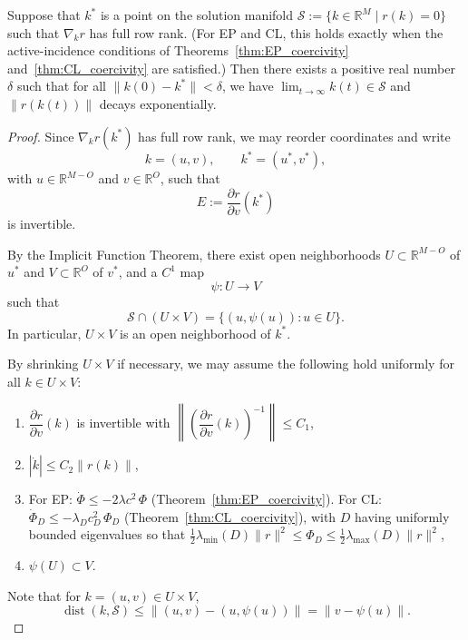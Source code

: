 \documentclass[10pt,a4paper]{amsart}
\begin{document}
\begin{theorem}\label{thm:local_convergence}
Suppose that $k^*$ is a point on the solution manifold $\mathcal{S}:=\{k \in \mathbb{R}^M \mid r(k) = 0\}$ such that $\nabla_k r$ has full row rank. (For EP and CL, this holds exactly when the active-incidence conditions of Theorems~\ref{thm:EP_coercivity} and~\ref{thm:CL_coercivity} are satisfied.) Then there exists a positive real number $\delta$ such that for all $\|k(0) - k^*\| < \delta$, we have $\lim_{t \to \infty} k(t) \in \mathcal{S}$ and $\|r(k(t))\|$ decays exponentially.
\end{theorem}

\begin{proof}
Since $\nabla_k r(k^*)$ has full row rank, we may reorder coordinates and write
\[
k = (u,v), \qquad k^* = (u^*, v^*),
\]
with $u \in \mathbb{R}^{M-O}$ and $v \in \mathbb{R}^{O}$, such that
\[
E := \frac{\partial r}{\partial v}(k^*)
\]
is invertible.

By the Implicit Function Theorem, there exist open neighborhoods $U \subset \mathbb{R}^{M-O}$ of $u^*$ and $V \subset \mathbb{R}^{O}$ of $v^*$, and a $C^1$ map
\[
\psi : U \to V
\]
such that
\[
\mathcal{S} \cap (U \times V) = \{ (u, \psi(u)) : u \in U \}.
\]
In particular, $U \times V$ is an open neighborhood of $k^*$.

By shrinking $U \times V$ if necessary, we may assume the following hold uniformly for all $k \in U \times V$:
\begin{enumerate}
    \item[(i)] $\dfrac{\partial r}{\partial v}(k)$ is invertible with $\left\|\left(\dfrac{\partial r}{\partial v}(k)\right)^{-1}\right\| \le C_1$,
    \item[(ii)] $|\dot{k}| \le C_2 \|r(k)\|$,
    \item[(iii)] For EP: $\dot{\Phi} \leq -2\lambda c^2\,\Phi$ (Theorem~\ref{thm:EP_coercivity}). For CL: $\dot{\Phi}_D \leq -\lambda_D c_D^2\,\Phi_D$ (Theorem~\ref{thm:CL_coercivity}), with $D$ having uniformly bounded eigenvalues so that $\tfrac{1}{2}\lambda_{\min}(D)\|r\|^2 \leq \Phi_D \leq \tfrac{1}{2}\lambda_{\max}(D)\|r\|^2$,
    \item[(iv)] $\psi(U) \subset V$.
\end{enumerate}


Note that for $k = (u,v) \in U \times V$,
\begin{equation}
\operatorname{dist}(k,\mathcal S)
\le \|(u,v)-(u,\psi(u))\|
= \|v-\psi(u)\|.
\label{eq:dist-bound-v}
\end{equation}


\end{proof}
\end{document}
